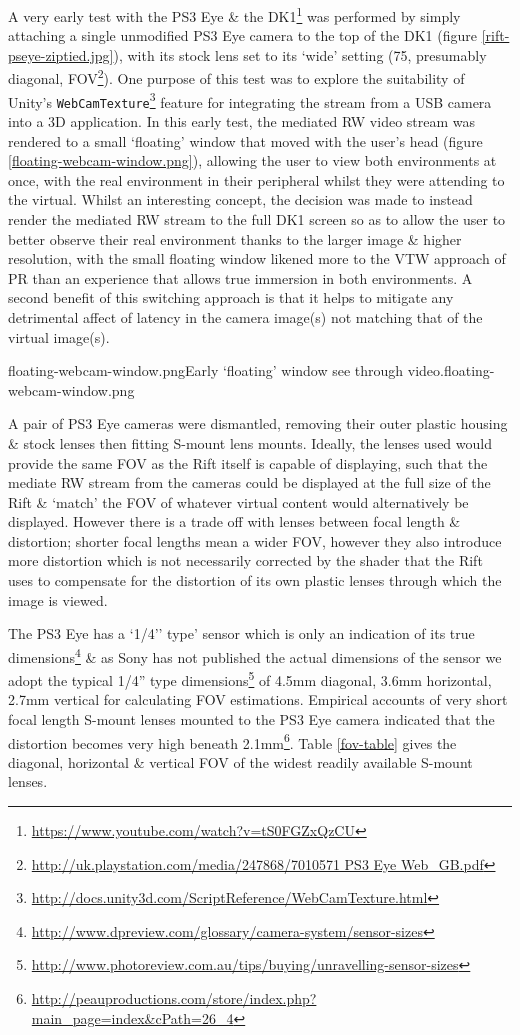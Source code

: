 A very early test with the PS3 Eye \& the DK1\footnote{\url{https://www.youtube.com/watch?v=tS0FGZxQzCU}} was performed by simply attaching a single unmodified PS3 Eye camera to the top of the DK1 (figure \ref{rift-pseye-ziptied.jpg}), with its stock lens set to its `wide' setting (75\textdegree, presumably diagonal, FOV\footnote{\url{http://uk.playstation.com/media/247868/7010571 PS3 Eye Web_GB.pdf}}). One purpose of this test was to explore the suitability of Unity's \texttt{WebCamTexture}\footnote{\url{http://docs.unity3d.com/ScriptReference/WebCamTexture.html}} feature for integrating the stream from a USB camera into a 3D application. In this early test, the mediated RW video stream was rendered to a small `floating' window that moved with the user's head (figure \ref{floating-webcam-window.png}), allowing the user to view both environments at once, with the real environment in their peripheral whilst they were attending to the virtual. Whilst an interesting concept, the decision was made to instead render the mediated RW stream to the full DK1 screen so as to allow the user to better observe their real environment thanks to the larger image \& higher resolution, with the small floating window likened more to the VTW approach of PR than an experience that allows true immersion in both environments. A second benefit of this switching approach is that it helps to mitigate any detrimental affect of latency in the camera image(s) not matching that of the virtual image(s).

       {floating-webcam-window.png}{Early `floating' window see through video.}{floating-webcam-window.png}

A pair of PS3 Eye cameras were dismantled, removing their outer plastic housing \& stock lenses then fitting S-mount lens mounts. Ideally, the lenses used would provide the same FOV as the Rift itself is capable of displaying, such that the mediate RW stream from the cameras could be displayed at the full size of the Rift \& `match' the FOV of whatever virtual content would alternatively be displayed. However there is a trade off with lenses between focal length \& distortion; shorter focal lengths mean a wider FOV, however they also introduce more distortion which is not necessarily corrected by the shader that the Rift uses to compensate for the distortion of its own plastic lenses through which the image is viewed.

The PS3 Eye has a `1/4'' type' sensor which is only an indication of its true dimensions\footnote{\url{http://www.dpreview.com/glossary/camera-system/sensor-sizes}} \& as Sony has not published the actual dimensions of the sensor we adopt the typical 1/4'' type dimensions\footnote{\url{http://www.photoreview.com.au/tips/buying/unravelling-sensor-sizes}} of 4.5mm diagonal, 3.6mm horizontal, 2.7mm vertical for calculating FOV estimations. Empirical accounts of very short focal length S-mount lenses mounted to the PS3 Eye camera indicated that the distortion becomes very high beneath 2.1mm\footnote{\url{http://peauproductions.com/store/index.php?main_page=index&cPath=26_4}}. Table \ref{fov-table} gives the diagonal, horizontal \& vertical FOV of the widest readily available S-mount lenses.

